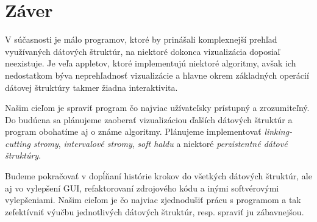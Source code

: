 \section{Záver}

V súčasnosti je málo programov, ktoré by prinášali komplexnejší prehľad 
využívaných dátových štruktúr, na niektoré dokonca vizualizácia doposiaľ 
neexistuje. Je veľa appletov, ktoré implementujú niektoré algoritmy, avšak 
ich nedostatkom býva neprehľadnosť vizualizácie a hlavne okrem základných 
operácií dátovej štruktúry takmer žiadna interaktivita. 

Našim cieľom je spraviť program čo najviac užívateľsky prístupný a zrozumiteľný. 
Do budúcna sa plánujeme zaoberať vizualizáciou ďalších dátových 
štruktúr a program obohatíme aj o známe algoritmy. Plánujeme implementovať 
\emph{linking-cutting stromy}, \emph{intervalové stromy}, \emph{soft haldu} 
a niektoré \emph{perzistentné dátové štruktúry}.

Budeme pokračovať v 
dopĺňaní histórie krokov do všetkých dátových štruktúr, ale aj vo vylepšení 
GUI, refaktorovaní zdrojového kódu a inými softvérovými vylepšeniami. Našim 
cieľom je čo najviac zjednodušiť prácu s programom a tak zefektívniť výučbu 
jednotlivých dátových štruktúr, resp. spraviť ju zábavnejšou.

